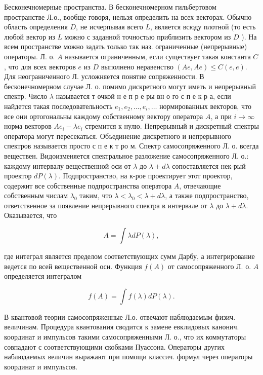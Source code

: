 \documentclass[10pt]{article}
\begin{document}
Бесконечномерные пространства. В бесконечномерном гильбертовом пространстве Л.о., вообще говоря, нельзя определить на всех векторах. Обычно область определения $D$, не исчерпывая всего $L$, является всюду плотной (то есть любой вектор из $L$ можно с заданной точностью приблизить вектором из $D$ ). На всем пространстве можно задать только так наз. ограниченные (непрерывные) операторы. Л. о. $A$ называется ограниченным, если существует такая константа $C$, что для всех векторов $e$ из $D$ выполнено неравенство $(A e, A e) \leqslant C(e, e)$. Для неограниченного Л. усложняется понятие сопряженности. В бесконечномерном случае Л. о. помимо дискретного могут иметь и непрерывный спектр. Число $\lambda$ называется т очкой н е п р е ры вн о го с п е к р а, если найдется такая последовательность $e_{1}, e_{2}, \ldots, e_{i}, \ldots$ нормированных векторов, что все они ортогональны каждому собственному вектору оператора $A$, а при $i \rightarrow \infty$ норма векторов $A e_{i}-\lambda e_{i}$ стремится к нулю. Непрерывный и дискретный спектры оператора могут пересекаться. Объединение дискретного и непрерывного спектров называется просто с п е к т ро м. Спектр самосопряженного Л. о. всегда веществен. Видоизменяется спектральное разложение самосопряженного Л. о.: каждому интервалу вещественной оси от $\lambda$ до $\lambda+d \lambda$ сопоставляется нек-рый проектор $d P(\lambda)$. Подпространство, на к-рое проектирует этот проектор, содержит все собственные подпространства оператора $A$, отвечающие собственным числам $\lambda_{0}$ таким, что $\lambda<\lambda_{0}<\lambda+d \lambda$, а также подпространство, ответственное за появление непрерывного спектра в интервале от $\lambda$ до $\lambda+d \lambda$. Оказывается, что



\[

A=\int \lambda d P(\lambda),

\]



где интеграл является пределом соответствующих сумм Дарбу, а интегрирование ведется по всей вещественной оси. Функция $f(A)$ от самосопряженного Л. о. $A$ определяется интегралом



\[

f(A)=\int f(\lambda) d P(\lambda) .

\]



В квантовой теории самосопряженные Л.о. отвечают наблюдаемым физич. величинам. Процедура квантования сводится к замене евклидовых канонич. координат и импульсов такими самосопряженными Л. о., что их коммутаторы совпадают с соответствующими скобками Пуассона. Операторы других наблюдаемых величин выражают при помощи классич. формул через операторы координат и импульсов.
\end{document}
